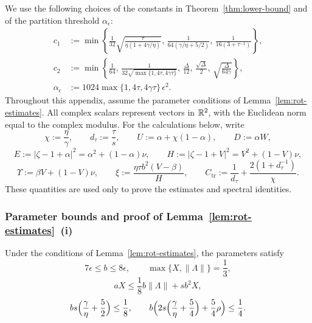 We use the following choices of the constants in Theorem~\ref{thm:lower-bound}
and of the partition threshold \(\alpha_\epsilon\):
\begin{equation}
\label{eq:rot-thresholds}
\begin{aligned}
c_1&:=\min\left\{
\frac1{32}\sqrt{\frac{\tau}{\eta(1+4\gamma/\eta)}},\,
\frac1{64(\gamma/\eta+5/2)},\,
\frac1{16(3+\tau^{-1})}\right\},\\
c_2&:=\min\left\{\frac1{64},\,
\frac1{32\sqrt{\max\{1,4\tau,4\gamma\tau\}}},\,
\frac\Delta{12},\,\frac{\sqrt\Delta}{2},\,
\sqrt{\frac\Delta{64\gamma}}\right\},\\
\alpha_\epsilon&:=1024\max\{1,4\tau,4\gamma\tau\}\,\epsilon^2.
\end{aligned}
\end{equation}
Throughout this appendix, assume the parameter conditions of
Lemma~\ref{lem:rot-estimates}. All complex scalars represent vectors in
\(\mathbb{R}^2\), with the Euclidean norm equal to the complex modulus.
For the calculations below, write
\[
\chi:=\frac\eta\gamma,\qquad d_\tau:=\frac\tau s,\qquad
U:=\alpha+\chi(1-\alpha),\qquad D:=\alpha W,
\]
\[
E:=|\zeta-1+\alpha|^2=\alpha^2+(1-\alpha)\nu,\qquad
H:=|\zeta-1+V|^2=V^2+(1-V)\nu,
\]
\[
\Upsilon:=\beta V+(1-V)\nu,\qquad
\xi:=\frac{\eta\tau b^2(V-\beta)}H,\qquad
C_\mathrm{tr}:=\frac1{d_\tau}+\frac{2(1+d_\tau^{-1})}{\chi}.
\]
These quantities are used only to prove the estimates and spectral identities.

\subsubsection{Parameter bounds and proof of Lemma~\ref{lem:rot-estimates}~(i)}
\label{app:lb-rotation-params-proof}
\begin{lemma}
\label{lem:rot-parameter-bounds}
Under the conditions of Lemma~\ref{lem:rot-estimates}, the parameters satisfy
\[
7\epsilon\le b\le8\epsilon,
\qquad \max\{X,\|\Lambda\|\}=\frac13,
\]
\[
aX\le\frac18b\|\Lambda\|+sb^2X,
\]
\[
bs\Bigl(\frac{\gamma}{\eta}+\frac52\Bigr)\le\frac18,
\qquad
b\Bigl(2s\Bigl(\frac{\gamma}{\eta}+\frac54\Bigr)+\frac54\rho\Bigr)\le\frac14.
\]
\end{lemma}

